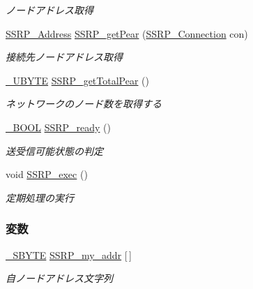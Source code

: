 \begin{DoxyCompactItemize}
\begin{DoxyCompactList}\small\item\em ノードアドレス取得 \end{DoxyCompactList}\item 
\hyperlink{ssrp_8h_af52db94d5ce59044edabda26c25f92f9_af52db94d5ce59044edabda26c25f92f9}{S\+S\+R\+P\+\_\+\+Address} \hyperlink{ssrp_8h_a0b9fca2ed26b4a74b8f69f356677fc84_a0b9fca2ed26b4a74b8f69f356677fc84}{S\+S\+R\+P\+\_\+get\+Pear} (\hyperlink{ssrp_8h_a7dcaa29c248300ccd1e2b9932d59041e_a7dcaa29c248300ccd1e2b9932d59041e}{S\+S\+R\+P\+\_\+\+Connection} con)
\begin{DoxyCompactList}\small\item\em 接続先ノードアドレス取得 \end{DoxyCompactList}\item 
\hyperlink{stddef_8h_aac464b47452ce9406f88ef194e2becc1_aac464b47452ce9406f88ef194e2becc1}{\+\_\+\+U\+B\+Y\+T\+E} \hyperlink{ssrp_8h_a9240dde7ea686a06a93a077fbe992d9f_a9240dde7ea686a06a93a077fbe992d9f}{S\+S\+R\+P\+\_\+get\+Total\+Pear} ()
\begin{DoxyCompactList}\small\item\em ネットワークのノード数を取得する \end{DoxyCompactList}\item 
\hyperlink{stddef_8h_afbf708854fe02af8475a9ba02f3196cb_afbf708854fe02af8475a9ba02f3196cb}{\+\_\+\+B\+O\+O\+L} \hyperlink{ssrp_8h_a3a7aa1a88902aa601273dc0bffc7ebee_a3a7aa1a88902aa601273dc0bffc7ebee}{S\+S\+R\+P\+\_\+ready} ()
\begin{DoxyCompactList}\small\item\em 送受信可能状態の判定 \end{DoxyCompactList}\item 
void \hyperlink{ssrp_8h_ac96d60ff1f8be5a2c06c6a6d076c97bb_ac96d60ff1f8be5a2c06c6a6d076c97bb}{S\+S\+R\+P\+\_\+exec} ()
\begin{DoxyCompactList}\small\item\em 定期処理の実行 \end{DoxyCompactList}\end{DoxyCompactItemize}
\subsubsection*{変数}
\begin{DoxyCompactItemize}
\item 
\hyperlink{stddef_8h_aab65237ca9fbf4192a39cf12dd165942_aab65237ca9fbf4192a39cf12dd165942}{\+\_\+\+S\+B\+Y\+T\+E} \hyperlink{ssrp_8h_aa4c37698233390ed91134a95341cb625_aa4c37698233390ed91134a95341cb625}{S\+S\+R\+P\+\_\+my\+\_\+addr} \mbox{[}$\,$\mbox{]}
\begin{DoxyCompactList}\small\item\em 自ノードアドレス文字列 \end{DoxyCompactList}\end{DoxyCompactItemize}


